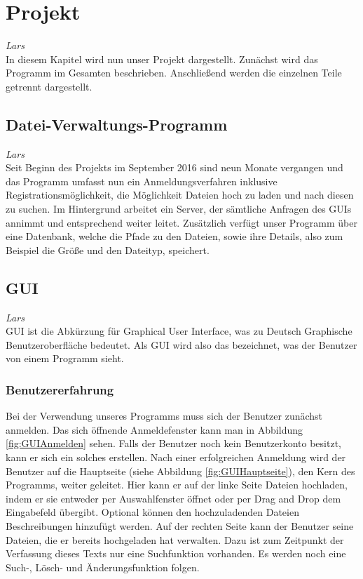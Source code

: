 \documentclass[12pt,a4paper,bibliography=totocnumbered,listof=totocnumbered]{scrartcl}
\begin{document}
\section{Projekt}
\label{sec:Projekt}
\emph{Lars}\\
In diesem Kapitel wird nun unser Projekt dargestellt. Zunächst wird das Programm im Gesamten beschrieben. Anschließend werden die einzelnen Teile getrennt dargestellt.

\subsection{Datei-Verwaltungs-Programm}
\emph{Lars}\\
Seit Beginn des Projekts im September 2016 sind neun Monate vergangen und das Programm umfasst nun ein Anmeldungsverfahren inklusive Registrationsmöglichkeit, die Möglichkeit Dateien hoch zu laden und nach diesen zu suchen. Im Hintergrund arbeitet ein Server, der sämtliche Anfragen des GUIs annimmt und entsprechend weiter leitet. Zusätzlich verfügt unser Programm über eine Datenbank, welche die Pfade zu den Dateien, sowie ihre Details, also zum Beispiel die Größe und den Dateityp, speichert.

\subsection{GUI}
\label{GUI}
\emph{Lars}\\
GUI ist die Abkürzung für \glqq Graphical User Interface\grqq , was zu Deutsch \glqq Graphische Benutzeroberfläche\grqq{} bedeutet. Als GUI wird also das bezeichnet, was der Benutzer von einem Programm sieht. \\

\subsubsection{Benutzererfahrung}
\label{Benutzererfahrung}
Bei der Verwendung unseres Programms muss sich der Benutzer zunächst anmelden. Das sich öffnende Anmeldefenster kann man in Abbildung \ref{fig:GUIAnmelden} sehen. Falls der Benutzer noch kein Benutzerkonto besitzt, kann er sich ein solches erstellen. Nach einer erfolgreichen Anmeldung wird der Benutzer auf die Hauptseite (siehe Abbildung \ref{fig:GUIHauptseite}), den Kern des Programms, weiter geleitet. Hier kann er auf der linke Seite Dateien hochladen, indem er sie entweder per Auswahlfenster öffnet oder per Drag and Drop dem Eingabefeld übergibt. Optional können den hochzuladenden Dateien Beschreibungen hinzufügt werden. Auf der rechten Seite kann der Benutzer seine Dateien, die er bereits hochgeladen hat verwalten. Dazu ist zum Zeitpunkt der Verfassung dieses Texts nur eine Suchfunktion vorhanden. Es werden noch eine Such-, Lösch- und Änderungsfunktion folgen.\\
\end{document}
